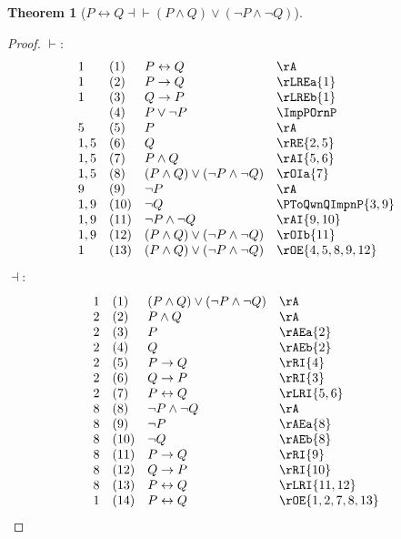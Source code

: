 \documentclass{book}
\theoremstyle{plain}
\newtheorem{theorem}{Theorem}
\theoremstyle{remark}
\theoremstyle{definition}
\begin{document}
\label{PLrQEqvLpPAndQRpOrLpnPAndnQRp}
\begin{theorem}[\(P \leftrightarrow Q \dashv \vdash  (P \land Q) \lor (\neg P\land \neg Q)\)]
\end{theorem}
\begin{proof}
	\(\vdash:\)
	\[
	\begin{array}{llll}
		1 & (1) & P \leftrightarrow Q & \rA \\
		1 & (2) & P \rightarrow Q & \rLREa{1} \\
		1 & (3) & Q \rightarrow P & \rLREb{1} \\
		& (4) & P \lor \neg P & \ImpPOrnP \\
		5 & (5) & P & \rA \\
		1,5 & (6) & Q & \rRE{2,5} \\
		1,5 & (7) & P \land Q & \rAI{5,6} \\
		1,5 & (8) & (P \land Q) \lor (\neg P\land \neg Q) & \rOIa{7} \\
		9 & (9) & \neg P & \rA \\
		1,9 & (10) & \neg Q & \PToQwnQImpnP{3,9} \\
		1,9 & (11) & \neg P \land \neg Q & \rAI{9,10} \\
		1,9 & (12) & (P \land Q) \lor (\neg P\land \neg Q) & \rOIb{11} \\
		1 & (13) & (P \land Q) \lor (\neg P\land \neg Q) & \rOE{4,5,8,9,12} \\
	\end{array}
	\]
	
	\(\dashv:\)
	
	\[
	\begin{array}{llll}
		1 & (1) & (P \land Q) \lor (\neg P\land \neg Q) & \rA \\
		2 & (2) & P \land Q & \rA \\
		2 & (3) & P & \rAEa{2} \\
		2 & (4) & Q & \rAEb{2} \\
		2 & (5) & P \rightarrow Q & \rRI{4} \\
		2 & (6) & Q \rightarrow P & \rRI{3} \\
		2 & (7) & P \leftrightarrow Q & \rLRI{5,6} \\
		8 & (8) & \neg P \land \neg Q & \rA \\
		8 & (9) & \neg P & \rAEa{8} \\
		8 & (10) & \neg Q & \rAEb{8} \\
		8 & (11) & P \rightarrow Q & \rRI{9} \\
		8 & (12) & Q \rightarrow P & \rRI{10} \\
		8 & (13) & P \leftrightarrow Q & \rLRI{11,12} \\
		1 & (14) & P \leftrightarrow Q & \rOE{1,2,7,8,13} \\
	\end{array}
	\]
\end{proof}
\end{document}
